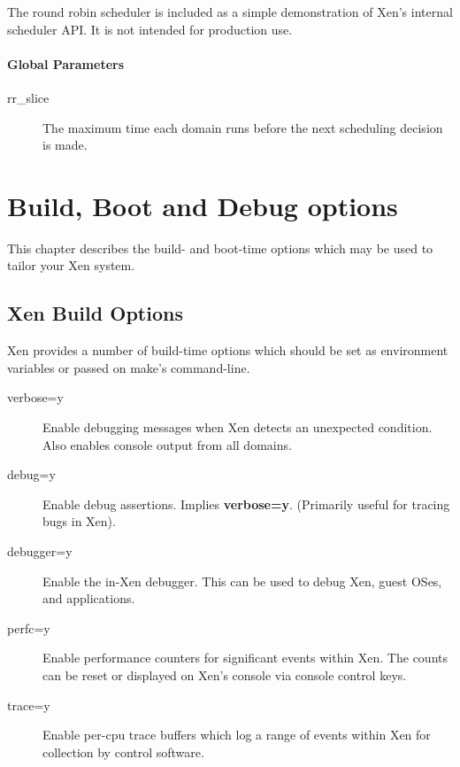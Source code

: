 \documentclass[11pt,twoside,final,openright]{report}
\begin{document}
{The round robin scheduler is included as a simple demonstration of
Xen's internal scheduler API.  It is not intended for production use. 

\subsubsection{Global Parameters}

\begin{description}
\item[rr\_slice]
  The maximum time each domain runs before the next
  scheduling decision is made.
\end{description}












\chapter{Build, Boot and Debug options} 

This chapter describes the build- and boot-time options 
which may be used to tailor your Xen system. 

\section{Xen Build Options}

Xen provides a number of build-time options which should be 
set as environment variables or passed on make's command-line.  

\begin{description} 
\item[verbose=y] Enable debugging messages when Xen detects an unexpected condition.
Also enables console output from all domains.
\item[debug=y] 
Enable debug assertions.  Implies {\bf verbose=y}.
(Primarily useful for tracing bugs in Xen).       
\item[debugger=y] 
Enable the in-Xen debugger. This can be used to debug 
Xen, guest OSes, and applications.
\item[perfc=y] 
Enable performance counters for significant events
within Xen. The counts can be reset or displayed
on Xen's console via console control keys.
\item[trace=y] 
Enable per-cpu trace buffers which log a range of
events within Xen for collection by control
software. 
\end{description} 

}
\end{document}
